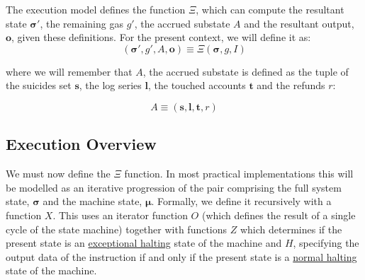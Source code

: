 \documentclass[9pt,oneside]{amsart}
\begin{document}
\begin{multicols}{2}
The execution model defines the function $\Xi$, which can compute the resultant state $\boldsymbol{\sigma}'$, the remaining gas $g'$, the accrued substate $A$ and the resultant output, $\mathbf{o}$, given these definitions. For the present context, we will define it as:
\begin{equation}
(\boldsymbol{\sigma}', g', A, \mathbf{o}) \equiv \Xi(\boldsymbol{\sigma}, g, I)
\end{equation}

where we will remember that $A$, the accrued substate is defined as the tuple of the suicides set $\mathbf{s}$, the log series $\mathbf{l}$, the touched accounts $\mathbf{t}$ and the refunds $r$:

\begin{equation}
A \equiv (\mathbf{s}, \mathbf{l}, \mathbf{t}, r)
\end{equation}

\subsection{Execution Overview}

We must now define the $\Xi$ function. In most practical implementations this will be modelled as an iterative progression of the pair comprising the full system state, $\boldsymbol{\sigma}$ and the machine state, $\boldsymbol{\mu}$. Formally, we define it recursively with a function $X$. This uses an iterator function $O$ (which defines the result of a single cycle of the state machine) together with functions \hyperlink{zhalt}{$Z$} which determines if the present state is an \hyperlink{zhalt}{exceptional halting} state of the machine and \hyperlink{hhalt}{$H$}, specifying the output data of the instruction if and only if the present state is a \hyperlink{hhalt}{normal halting} state of the machine.


\end{multicols}
\end{document}

